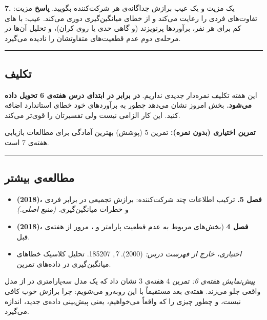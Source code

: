 \textbf{7.} یک مزیت و یک عیب برازش جداگانه‌ی هر شرکت‌کننده بگویید.
\textbf{پاسخ} مزیت: تفاوت‌های فردی را رعایت می‌کند و از خطای میانگین‌گیری
دوری می‌کند. عیب: با های کم برای هر نفر، برآوردها پرنویزند (و
گاهی حدی یا روی کران)، و تحلیل آن‌ها در مرحله‌ی دوم عدم قطعیت‌های متفاوتشان
را نادیده می‌گیرد.

\begin{center}\rule{0.5\linewidth}{0.5pt}\end{center}

\subsection{تکلیف}

این هفته تکلیف نمره‌دار جدیدی نداریم. \textbf{ در برابر
 در ابتدای درس هفته‌ی 6 تحویل داده می‌شود.} بخش  امروز
نشان می‌دهد چطور به برآوردهای  خود خطای استاندارد اضافه کنید. این
کار الزامی نیست ولی تفسیرتان را قوی‌تر می‌کند.

\textbf{تمرین اختیاری (بدون نمره):} تمرین 5 (پوشش) بهترین آمادگی برای
مطالعات بازیابی هفته‌ی 7 است.

\begin{center}\rule{0.5\linewidth}{0.5pt}\end{center}

\subsection{مطالعه‌ی بیشتر}

\begin{itemize}
\tightlist
\item
  \textbf{ \lr{\&}  (2018)، فصل 5.} ترکیب اطلاعات
  چند شرکت‌کننده: برازش تجمیعی در برابر فردی و خطرات میانگین‌گیری.
  \emph{(منبع اصلی.)}
\item
  \textbf{ \lr{\&}  (2018)، فصل 4} (بخش‌های مربوط
  به عدم قطعیت پارامتر و ، مرور از هفته‌ی قبل.
\item
  \emph{اختیاری، خارج از فهرست درس:}  \lr{\&}
   (2000).  \emph{
  \lr{\&}  7}, 185\lr{--}207. تحلیل کلاسیک خطاهای میانگین‌گیری در
  داده‌های تمرین.
\end{itemize}

\emph{پیش‌نمایش هفته‌ی 6:} تمرین 4 هفته‌ی 3 نشان داد که یک مدل سه‌پارامتری
در  از مدل واقعی جلو می‌زند. هفته‌ی بعد مستقیماً با این روبه‌رو
می‌شویم: چرا برازش خوب کافی نیست، و چطور  چیزی را که
واقعاً می‌خواهیم، یعنی پیش‌بینی داده‌ی جدید، اندازه می‌گیرد.
